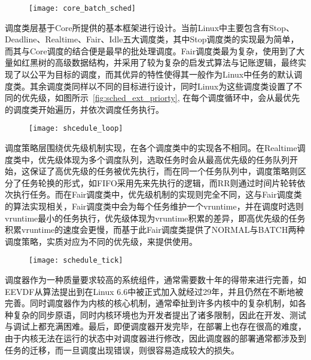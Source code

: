 \begin{figure}[!htbp]
    \centering
    \texttt{[image: core\_batch\_sched]}
    \label{fig:core_batch_sched}
\end{figure}

调度类层基于Core所提供的基本框架进行设计。当前Linux中主要包含有Stop、Deadline、Realtime、Fair、Idle五大调度类\citep{scheduler}，其中Stop调度类的实现最为简单，而其与Core调度的结合便是最早的批处理调度。Fair调度类最为复杂，使用到了大量如红黑树的高级数据结构，并采用了较为复杂的启发式算法与记账逻辑，最终实现了以公平为目标的调度，而其优异的特性使得其一般作为Linux中任务的默认调度类。其余调度类同样以不同的目标进行设计，同时Linux为这些调度类设置了不同的优先级，如图所示~\ref{fig:sched_ext_priorty}, 在每个调度循环中，会从最优先的调度类开始遍历，并依次调度任务执行。

\begin{figure}[!htbp]
    \centering 
    \texttt{[image: shcedule\_loop]}
    \label{fig:shcedule_loop}
\end{figure}

调度策略层围绕优先级机制实现，在各个调度类中的实现各不相同。在Realtime调度类中，优先级体现为多个调度队列，选取任务时会从最高优先级的任务队列开始，这保证了高优先级的任务被优先执行，而在同一个任务队列中，调度策略则区分了任务轮换的形式，如FIFO采用先来先执行的逻辑，而RR则通过时间片轮转依次执行任务。而在Fair调度类中，优先级机制的实现则完全不同，这与Fair调度类的算法实现相关，Fair调度类中会为每个任务维护一个vruntime，并在调度时选则vruntime最小的任务执行，优先级体现为vruntime积累的差异，即高优先级的任务积累vruntime的速度会更慢，而基于此Fair调度类提供了NORMAL与BATCH两种调度策略，实质对应为不同的优先级，来提供使用。

\begin{figure}[!htbp]
    \centering
    \texttt{[image: schedule\_tick]}
    \label{fig:schedule_tick}
\end{figure}

调度器作为一种质量要求较高的系统组件，通常需要数十年的得带来进行完善\citep{agache2020firecracker}，如EEVDF从算法提出到在Linux 6.6中被正式加入就经过29年，并且仍然在不断地被完善。同时调度器作为内核的核心机制，通常牵扯到许多内核中的复杂机制，如各种复杂的同步原语，同时内核环境也为开发者提出了诸多限制，因此在开发、测试与调试上都充满困难\citep{humphries2021ghost}。最后，即便调度器开发完毕，在部署上也存在很高的难度，由于内核无法在运行的状态中对调度器进行修改，因此调度器的部署通常都涉及到任务的迁移，而一旦调度出现错误，则很容易造成较大的损失。

